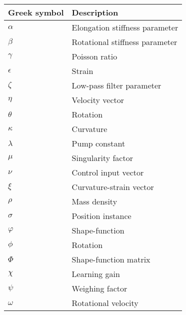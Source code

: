 \begin{spacing}{0.9}
\begin{multicols}{2}
\begin{table}[H]
\centering
    \begin{tabular}{p{2.5cm} p{3.4cm}} \hline
    \textbf{Greek symbol}    &   \textbf{Description }\\ \hline
    $\alpha$      & Elongation stiffness parameter  \\
    $\beta$       & Rotational stiffness parameter \\
    $\gamma$      & Poisson ratio \\
    $\epsilon$    & Strain \\
    $\zeta$       & Low-pass filter parameter \\
    $\eta$        & Velocity vector \\
    $\theta$      & Rotation \\
    $\kappa$      & Curvature \\
    $\lambda$     & Pump constant \\
    $\mu$         & Singularity factor \\
    $\nu$         & Control input vector \\
    $\xi$         & Curvature-strain vector \\
    $\rho$        & Mass density \\
    $\sigma$      & Position instance \\
    $\varphi$     & Shape-function \\
    $\phi$        & Rotation  \\
    $\Phi$        & Shape-function matrix \\
    $\chi$         & Learning gain \\
    $\psi$        & Weighing factor \\
    $\omega$      &  Rotational velocity \\ \hline

    
    \end{tabular}
\end{table}



\end{multicols}
\end{spacing}
